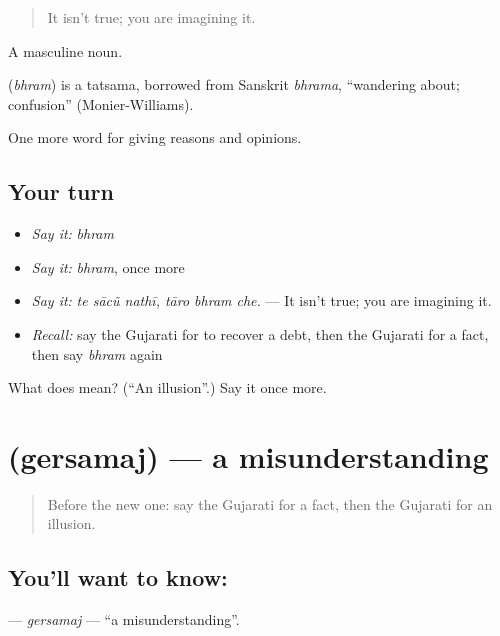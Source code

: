 \begin{quote}
It isn't true; you are imagining it.
\end{quote}

A masculine noun.

\begin{cousinweb}
\textbf{} (\emph{bhram}) is a tatsama, borrowed from Sanskrit \emph{bhrama}, \textquotedblleft{}wandering about; confusion\textquotedblright{} (Monier-Williams).
\end{cousinweb}

\begin{grammarlens}[title={What you've built}]
One more word for giving reasons and opinions.
\end{grammarlens}

\subsection*{Your turn}
\begin{itemize}
\raggedright
  \item \emph{Say it:} \emph{bhram}
  \item \emph{Say it:} \emph{bhram}, once more
  \item \emph{Say it:} \emph{te sācũ nathī, tāro bhram che.} — It isn't true; you are imagining it.
  \item \emph{Recall:} say the Gujarati for to recover a debt, then the Gujarati for a fact, then say \emph{bhram} again
\end{itemize}

\begin{tcolorbox}[breakable,colback=teal!4,colframe=teal!35!black,title={Before you move on}]
What does  mean? (\textquotedblleft{}An illusion\textquotedblright{}.) Say it once more.
\end{tcolorbox}
\section[\texorpdfstring{\gu{ગેરસમજ} (gersamaj)}{ગેરસમજ (gersamaj)}]{ (gersamaj) — a misunderstanding}

\label{lesson:GU-C351-gersamaj}



\begin{quote}
Before the new one: say the Gujarati for a fact, then the Gujarati for an illusion.
\end{quote}

\subsection*{You'll want to know: }
\textbf{} — \emph{gersamaj} — \textquotedblleft{}a misunderstanding\textquotedblright{}.

